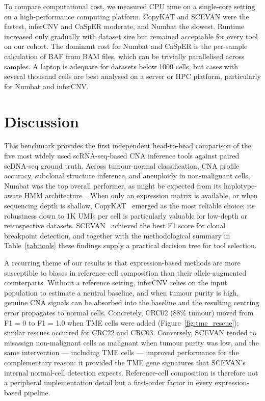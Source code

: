 \documentclass[11pt]{article}
\begin{document}
To compare computational cost, we measured CPU time on a single-core setting
on a high-performance computing platform. CopyKAT and SCEVAN were the
fastest, inferCNV and CaSpER moderate, and Numbat the slowest. Runtime
increased only gradually with dataset size but remained acceptable for every
tool on our cohort. The dominant cost for Numbat and CaSpER is the
per-sample calculation of BAF from BAM files, which can be trivially
parallelised across samples. A laptop is adequate for datasets below 1000
cells, but cases with several thousand cells are best analysed on a server
or HPC platform, particularly for Numbat and inferCNV.

\section{Discussion}

This benchmark provides the first independent head-to-head comparison of the
five most widely used scRNA-seq-based CNA inference tools against paired
scDNA-seq ground truth. Across tumour-normal classification, CNA profile
accuracy, subclonal structure inference, and aneuploidy in non-malignant
cells, Numbat was the top overall performer, as might be expected from its
haplotype-aware HMM architecture~\cite{gao2023numbat}. When only an
expression matrix is available, or when sequencing depth is shallow,
CopyKAT~\cite{gao2021copykat} emerged as the most reliable choice; its
robustness down to 1K UMIs per cell is particularly valuable for low-depth
or retrospective datasets. SCEVAN~\cite{defalco2023scevan} achieved the best
F1 score for clonal breakpoint detection, and together with the
methodological summary in Table~\ref{tab:tools} these findings supply a
practical decision tree for tool selection.

A recurring theme of our results is that expression-based methods are more
susceptible to biases in reference-cell composition than their
allele-augmented counterparts. Without a reference setting, inferCNV relies
on the input population to estimate a neutral baseline, and when tumour
purity is high, genuine CNA signals can be absorbed into the baseline and
the resulting centring error propagates to normal cells. Concretely, CRC02
(88\% tumour) moved from F1 = 0 to F1 = 1.0 when TME cells were added
(Figure~\ref{fig:tme_rescue}); similar rescues occurred for CRC22 and CRC03.
Conversely, SCEVAN tended to misassign non-malignant cells as malignant when
tumour purity was low, and the same intervention --- including TME cells
--- improved performance for the complementary reason: it provided the TME
gene signatures that SCEVAN's internal normal-cell detection expects.
Reference-cell composition is therefore not a peripheral implementation
detail but a first-order factor in every expression-based pipeline.
\end{document}
